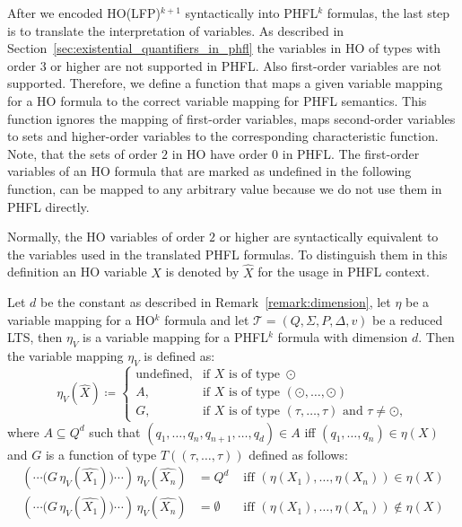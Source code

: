 After we encoded HO(LFP)$^{k+1}$ syntactically into PHFL$^k$ formulas, the last step is to translate the 
interpretation of variables. As described in Section~\ref{sec:existential_quantifiers_in_phfl} the variables in HO of 
types with order $3$ or higher are not supported in PHFL. Also first-order variables are not supported. Therefore, we 
define a function that maps a given variable mapping for a HO formula to the correct variable mapping for PHFL 
semantics. This function ignores the mapping of first-order variables, maps second-order variables to sets and 
higher-order variables to the corresponding characteristic function. Note, that the sets of order $2$ in HO have order 
$0$ in PHFL. The first-order variables of an HO formula that are marked as undefined in the following function, can be 
mapped to any arbitrary value because we do not use them in PHFL directly.

    Normally, the HO variables of order $2$ or higher are syntactically equivalent to the variables used in the translated PHFL formulas. To distinguish them in this definition an HO variable $X$ is denoted by $\hat{X}$ for the usage in PHFL context. 

\begin{definition}
    \label{definition:lower_bound_variable_function}
    Let $d$ be the constant as described in Remark~\ref{remark:dimension}, let $\eta$ be a
    variable mapping for a HO$^k$ formula and let $\mathcal{T} = (Q, \Sigma, P, \Delta, v)$ be a reduced LTS, then $\eta_V$ is a 
    variable mapping for a PHFL$^k$ formula with dimension $d$. Then the variable mapping $\eta_V$ is defined as:
    \[\eta_V(\hat{X})\coloneqq
    \begin{cases}
        \text{undefined}, & \text{if } X \text{ is of type } \odot \\
        A,  & \text{if } X \text{ is of type } (\odot, \dots, \odot)\\
        G, & \text{if } X \text{ is of type } (\tau, \dots, \tau) \text{ and } \tau \neq \odot,
    \end{cases}\]
    where $A \subseteq Q^d$ such that $(q_1, \dots, q_n, q_{n + 1}, \dots, q_d) \in A$ iff $(q_1, \dots, q_n) \in
    \eta(X)$ and $G$ is a function of type $T((\tau, \dots, \tau))$ defined as follows:
    \begin{align*}
        (\dotsb\big(G\,\eta_V(\hat{X_1})\big)\dotsb)\,\eta_V(\hat{X_n}) &= Q^d &\text{ iff } (\eta(X_1), \dots, \eta(X_n)) \in \eta(X)\\
        (\dotsb\big(G\,\eta_V(\hat{X_1})\big)\dotsb)\,\eta_V(\hat{X_n}) &= \emptyset &\text{ iff } (\eta(X_1), \dots, \eta(X_n))
        \not\in \eta(X)
    \end{align*}
\end{definition}

